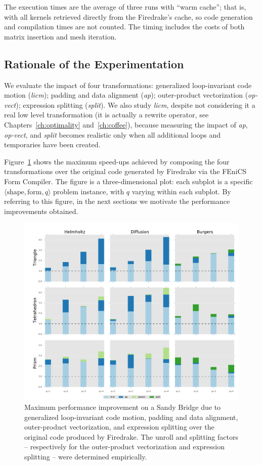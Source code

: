 The execution times are the average of three runs with ``warm cache''; that is, with all kernels retrieved directly from the Firedrake's cache, so code generation and compilation times are not counted. The timing includes the costs of both matrix insertion and mesh iteration. 

\subsection{Rationale of the Experimentation}
We evaluate the impact of four transformations: generalized loop-invariant code motion (\emph{licm}); padding and data alignment (\emph{ap}); outer-product vectorization (\emph{op-vect}); expression splitting (\emph{split}). We also study \emph{licm}, despite not considering it a real low level transformation (it is actually a rewrite operator, see Chapters~\ref{ch:optimality} and~\ref{ch:coffee}), because measuring the impact of \emph{ap}, \emph{op-vect}, and \emph{split} becomes realistic only when all additional loops and temporaries have been created.

Figure~\ref{fig:coffee-individual-res} shows the maximum speed-ups achieved by composing the four transformations over the original code generated by Firedrake via the FEniCS Form Compiler. The figure is a three-dimensional plot: each subplot is a specific ${\langle} \textrm{shape}, \mathrm{form}, q {\rangle}$ problem instance, with $q$ varying within each subplot. By referring to this figure, in the next sections we motivate the performance improvements obtained.

\begin{figure}[t]
\centerline{\includegraphics[scale=0.45]{lowlevelopt/perf-results/individual/plot_sb}}
\caption{Maximum performance improvement on a Sandy Bridge due to generalized loop-invariant code motion, padding and data alignment, outer-product vectorization, and expression splitting over the original code produced by Firedrake. The unroll and splitting factors -- respectively for the outer-product vectorization and expression splitting -- were determined empirically.}
\label{fig:coffee-individual-res}
\end{figure}


